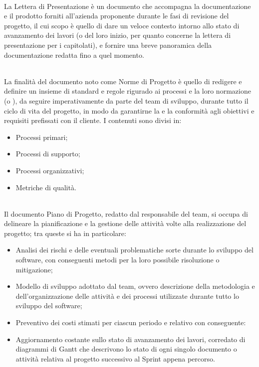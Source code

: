 \\
La Lettera di Presentazione è un documento che accompagna la documentazione e il prodotto forniti all'azienda proponente durante le fasi di revisione del progetto, il cui scopo è quello di dare un veloce contesto intorno allo stato di avanzamento dei lavori (o del loro inizio, per quanto concerne la lettera di presentazione per i capitolati), e fornire una breve panoramica della documentazione redatta fino a quel momento. 

\\
La finalità del documento noto come Norme di Progetto è quello di redigere e definire un insieme di standard e regole rigurado ai processi e la loro normazione (o ), da seguire imperativamente da parte del team di sviluppo, durante tutto il ciclo di vita del progetto, in modo da garantirne la  e la conformità agli obiettivi e requisiti prefissati con il cliente. I contenuti sono divisi in:
\begin{itemize}
    \item Processi primari;
    \item Processi di supporto;
    \item Processi organizzativi;
    \item Metriche di qualità.
\end{itemize}

\\
Il documento Piano di Progetto, redatto dal responsabile del team, si occupa di delineare la pianificazione e la gestione delle attività volte alla realizzazione del progetto; tra queste si ha in particolare:
\begin{itemize}
    \item Analisi dei rischi e delle eventuali problematiche sorte durante lo sviluppo del software, con conseguenti metodi per la loro possibile risoluzione o mitigazione;
    \item Modello di sviluppo adottato dal team, ovvero descrizione della metodologia e dell'organizzazione delle attività e dei processi utilizzate durante tutto lo sviluppo del software; 
    \item Preventivo dei costi stimati per ciascun periodo e relativo  con conseguente:
    \item Aggiornamento costante sullo stato di avanzamento dei lavori, corredato di diagrammi di Gantt che descrivono lo stato di ogni singolo documento o attività relativa al progetto successivo al Sprint appena percorso.
\end{itemize}

